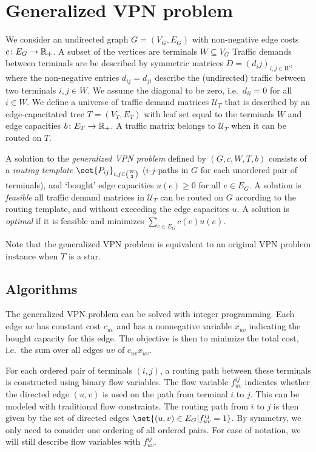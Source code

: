 \section{Generalized VPN problem}
We consider an undirected graph $G = (V_G, E_G)$ with non-negative edge costs $c\colon E_G \to \mathbb{R}_+$.
A subset of the vertices are terminals $W \subseteq V_G$
Traffic demands between terminals are be described by symmetric matrices $D = (d_ij)_{i,j \in W}$, where the non-negative entries $d_{ij} = d_{ji}$ describe the (undirected) traffic between two terminals $i,j \in W$.
We assume the diagonal to be zero, i.e.\ $d_{ii} = 0$ for all $i \in W$.
We define a universe of traffic demand matrices $\mathcal U_T$ that is described by an edge-capacitated tree $T = (V_T, E_T)$ with leaf set equal to the terminals $W$ and edge capacities $b\colon E_T \to \mathbb{R}_+$.
A traffic matrix belongs to $\mathcal U_T$ when it can be routed on $T$.

A solution to the \emph{generalized VPN problem} defined by $(G, c, W, T, b)$ consists of a \emph{routing template} $\set{P_{ij}}_{i,j \in \binom{W}{2}}$ ($i$-$j$-paths in $G$ for each unordered pair of terminals), and `bought' edge capacities $u(e) \ge 0$ for all $e \in E_G$.
A solution is \emph{feasible} all traffic demand matrices in $\mathcal U_T$ can be routed on $G$ according to the routing template, and without exceeding the edge capacities $u$.
A solution is \emph{optimal} if it is feasible and minimizes $\sum_{e \in E_G} c(e) u(e)$.

Note that the generalized VPN problem is equivalent to an original VPN problem instance when $T$ is a star.

\subsection{Algorithms}

The generalized VPN problem can be solved with integer programming.
Each edge $uv$ has constant cost $c_{uv}$ and has a nonnegative variable $x_{uv}$ indicating the bought capacity for this edge.
The objective is then to minimize the total cost, i.e.\ the sum over all edges $uv$ of $c_{uv} x_{uv}$.

For each ordered pair of terminals $(i, j)$, a routing path between these terminals is constructed using binary flow variables.
The flow variable $f_{uv}^{ij}$ indicates whether the directed edge $(u, v)$ is used on the path from terminal $i$ to $j$.
This can be modeled with traditional flow constraints.
The routing path from $i$ to $j$ is then given by the set of directed edges $\set{(u, v) \in E_G | f_{uv}^{ij} = 1}$.
By symmetry, we only need to consider one ordering of all ordered pairs.
For ease of notation, we will still describe flow variables with $f_{uv}^{ij}$.

